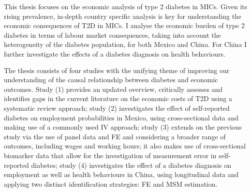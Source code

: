 This thesis focuses on the economic analysis of type 2 diabetes in \acfp{MIC}. Given its rising prevalence, in-depth country specific analysis is key for understanding the economic consequences of T2D in \acp{MIC}. I analyse the economic burden of type 2 diabetes in terms of labour market consequences, taking into account the heterogeneity of the diabetes population, for both Mexico and China. For China I further investigate the effects of a diabetes diagnosis on health behaviours.

The thesis consists of four studies with the unifying theme of improving our understanding of the causal relationship between diabetes and economic outcomes. Study (1) provides an updated overview, critically assesses and identifies gaps in the current literature on the economic costs of T2D using a systematic review approach; study (2) investigates the effect of self-reported diabetes on employment probabilities in Mexico, using cross-sectional data and making use of a commonly used \acf{IV} approach; study (3) extends on the previous study via the use of panel data and \acf{FE} and considering a broader range of outcomes, including wages and working hours; it also makes use of cross-sectional biomarker data that allow for the investigation of measurement error in self-reported diabetes; study (4) investigates the effect of a diabetes diagnosis on employment as well as health behaviours in China, using longitudinal data and applying two distinct identification strategies: \ac{FE} and \acf{MSM} estimation.

